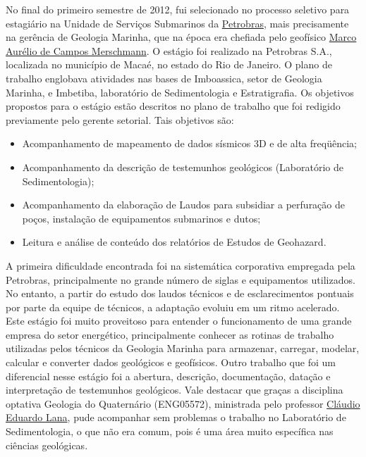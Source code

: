 \documentclass[10pt,a4paper,oneside]{book}
\begin{document}
No final do primeiro semestre de 2012, fui selecionado no processo seletivo para estagiário na Unidade de Serviços Submarinos da \href{https://petrobras.com.br/}{Petrobras}, mais precisamente na gerência de Geologia Marinha, que na época era chefiada pelo geofísico \href{https://br.linkedin.com/in/marco-aur\%C3\%A9lio-merschmann-b9381823}{Marco Aurélio de Campos Merschmann}. O estágio foi realizado na Petrobras S.A., localizada no município de Macaé, no estado do Rio de Janeiro. O plano de trabalho englobava atividades nas bases de Imboassica, setor de Geologia Marinha, e Imbetiba, laboratório de Sedimentologia e Estratigrafia. Os objetivos propostos para o estágio estão descritos no plano de trabalho que foi redigido previamente pelo gerente
setorial. Tais objetivos são:

\begin{itemize}
  \item Acompanhamento de mapeamento de dados sísmicos 3D e  de alta freqüência;
  \item Acompanhamento da descrição de testemunhos geológicos (Laboratório de Sedimentologia);
  \item Acompanhamento da elaboração de Laudos para subsidiar a perfuração de poços, instalação de equipamentos submarinos e dutos;
  \item Leitura e análise de conteúdo dos relatórios de Estudos de
Geohazard.
\end{itemize}

A primeira dificuldade encontrada foi na sistemática corporativa empregada pela Petrobras, principalmente no grande número de siglas e equipamentos utilizados. No entanto, a partir do estudo dos laudos técnicos e de esclarecimentos pontuais por parte da equipe de técnicos, a adaptação evoluiu em um ritmo acelerado. Este estágio foi muito proveitoso para entender o funcionamento de uma grande empresa do setor energético, principalmente conhecer as rotinas de trabalho utilizadas pelos técnicos da Geologia Marinha para armazenar, carregar, modelar, calcular e converter dados geológicos e geofísicos. Outro trabalho que foi um diferencial nesse estágio foi a abertura, descrição, documentação, datação e interpretação de testemunhos geológicos. Vale destacar que graças a disciplina optativa Geologia do Quaternário (ENG05572), ministrada pelo professor \href{http://lattes.cnpq.br/6157185791642499}{Cláudio Eduardo Lana}, pude acompanhar sem problemas o trabalho no Laboratório de Sedimentologia, o que não era comum, pois é uma área muito específica nas ciências geológicas.
\end{document}
